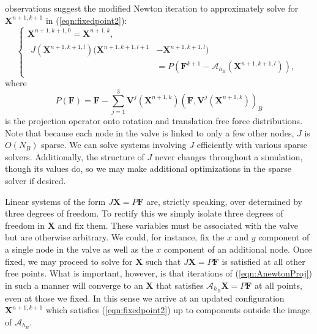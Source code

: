 \documentclass[preprint,12pt]{elsarticle}
\begin{document}
observations suggest the modified Newton iteration to approximately solve for $\mathbf{X}^{n+1,k+1}$ in (\ref{eqn:fixedpoint2}):
\begin{equation}
\left\{
\begin{gathered}
\mathbf{X}^{n+1,k+1,0} = \mathbf{X}^{n+1,k} , \\
\begin{split}
J(\mathbf{X}^{n+1,k+1,l})(\mathbf{X}^{n+1,k+1,l+1}& - \mathbf{X}^{n+1,k+1,l})   \\
& = P(\mathbf{F}^{k+1} - \mathcal{A}_{h_B}(\mathbf{X}^{n+1,k+1,l})),
\end{split}
\end{gathered}
\right.
\label{eqn:AnewtonProj}
\end{equation}
where
\begin{equation}
P(\mathbf{F}) = \mathbf{F} - \sum_{j=1}^3 \mathbf{V}^j(\mathbf{X}^{n+1,k})(\mathbf{F},\mathbf{V}^j(\mathbf{X}^{n+1,k}))_B 
\label{eqn:project}
\end{equation}
is the projection operator onto rotation and translation free force distributions. Note that because each node in the valve is linked to only a few other nodes, $J$ is $O(N_B)$ sparse. We can solve systems involving $J$ efficiently with various sparse solvers. Additionally, the structure of $J$ never changes throughout a simulation, though its values do, so we may make additional optimizations in the sparse solver if desired.

Linear systems of the form $J\mathbf{X}=P\mathbf{F}$ are, strictly speaking, over determined by three degrees of freedom. To rectify this we simply isolate three degrees of freedom in $\mathbf{X}$ and fix them. These variables must be associated with the valve but are otherwise arbitrary. We could, for instance, fix the $x$ and $y$ component of a single node in the valve as well as the $x$ component of an additional node. Once fixed,  we may proceed to solve for $\mathbf{X}$ such that $J\mathbf{X}=P\mathbf{F}$ is satisfied at all other free points. What is important, however, is that iterations of (\ref{eqn:AnewtonProj}) in such a manner will converge to an $\mathbf{X}$ that satisfies $\mathcal{A}_{h_B}\mathbf{X}=P\mathbf{F}$ at all points, even at those we fixed. In this sense we arrive at an updated configuration $\mathbf{X}^{n+1,k+1}$ which satisfies (\ref{eqn:fixedpoint2}) up to components outside the image of $\mathcal{A}_{h_B}$.
\end{document}
